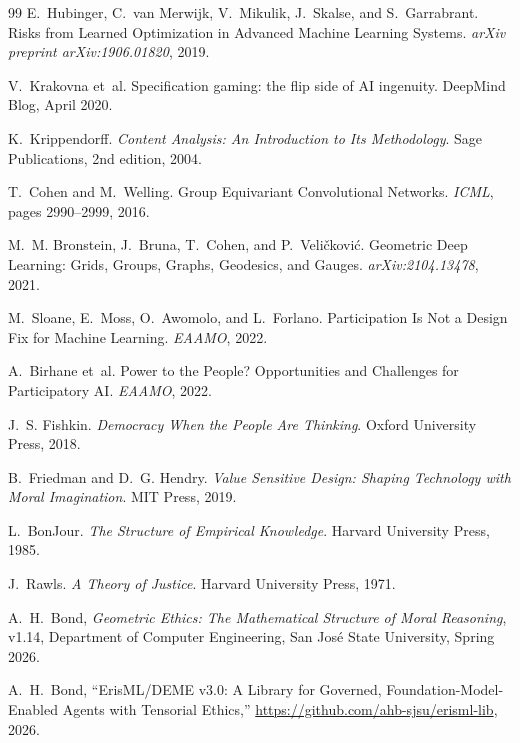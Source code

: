 \documentclass[12pt]{article}
\begin{document}
\begin{thebibliography}{99}
E.~Hubinger, C.~van Merwijk, V.~Mikulik, J.~Skalse, and S.~Garrabrant.
\newblock Risks from Learned Optimization in Advanced Machine Learning Systems.
\newblock \emph{arXiv preprint arXiv:1906.01820}, 2019.

V.~Krakovna et~al.
\newblock Specification gaming: the flip side of AI ingenuity.
\newblock DeepMind Blog, April 2020.

K.~Krippendorff.
\newblock \emph{Content Analysis: An Introduction to Its Methodology}.
\newblock Sage Publications, 2nd edition, 2004.

T.~Cohen and M.~Welling.
\newblock Group Equivariant Convolutional Networks.
\newblock \emph{ICML}, pages 2990--2999, 2016.

M.~M. Bronstein, J.~Bruna, T.~Cohen, and P.~Veli\v{c}kovi\'{c}.
\newblock Geometric Deep Learning: Grids, Groups, Graphs, Geodesics, and Gauges.
\newblock \emph{arXiv:2104.13478}, 2021.

M.~Sloane, E.~Moss, O.~Awomolo, and L.~Forlano.
\newblock Participation Is Not a Design Fix for Machine Learning.
\newblock \emph{EAAMO}, 2022.

A.~Birhane et~al.
\newblock Power to the People? Opportunities and Challenges for Participatory AI.
\newblock \emph{EAAMO}, 2022.

J.~S. Fishkin.
\newblock \emph{Democracy When the People Are Thinking}.
\newblock Oxford University Press, 2018.

B.~Friedman and D.~G. Hendry.
\newblock \emph{Value Sensitive Design: Shaping Technology with Moral Imagination}.
\newblock MIT Press, 2019.

L.~BonJour.
\newblock \emph{The Structure of Empirical Knowledge}.
\newblock Harvard University Press, 1985.

J.~Rawls.
\newblock \emph{A Theory of Justice}.
\newblock Harvard University Press, 1971.

A.~H.~Bond, \emph{Geometric Ethics: The Mathematical Structure of Moral Reasoning}, v1.14, Department of Computer Engineering, San Jos\'e State University, Spring 2026.

A.~H.~Bond, ``ErisML/DEME v3.0: A Library for Governed, Foundation-Model-Enabled Agents with Tensorial Ethics,'' \url{https://github.com/ahb-sjsu/erisml-lib}, 2026.

\end{thebibliography}
\end{document}
